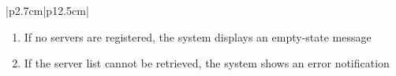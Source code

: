 \begin{table}[H]
\begin{tabular}{|p{2.7cm}|p{12.5cm}|}
\begin{minipage}[t]{\linewidth}
                                      \begin{enumerate}[topsep=0pt,itemsep=1pt,parsep=0pt,partopsep=0pt]
                                          \item If no servers are registered, the system displays an empty-state message
                                          \item If the server list cannot be retrieved, the system shows an error notification
                                      \end{enumerate}
                                  \end{minipage}          \\
        \hline
    \end{tabular}
    \label{tab:admin-list-proxmox-servers}
\end{table}
